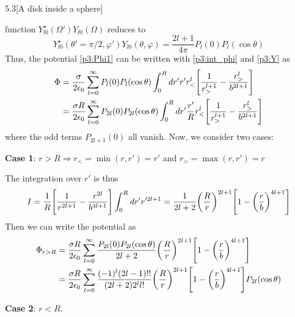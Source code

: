 \documentclass[12pt]{article}
\begin{document}
\begin{problem}{5.3}[A disk inside a sphere]
\begin{solution}
function $Y_{l0}^\star(\Omega')Y_{l0}(\Omega)$ reduces to
\begin{equation}\label{p3:Y}
    Y_{l0}^\star(\theta'=\pi/2,\varphi')Y_{l0}(\theta,\varphi)
    =\frac{2l+1}{4\pi}P_l(0)P_l(\cos\theta)
\end{equation}
Thus, the potential \eqref{p3:Phi1} can be written with \eqref{p3:int_phi} and
\eqref{p3:Y} as
\begin{align}
    \Phi
    &=\frac{\sigma}{2\epsilon_0}\sum_{l=0}^\infty P_l(0)P_{l}(\cos\theta)
    \int_0^Rdr' r'r_<^l\qty[\frac1{r_>^{l+1}}-\frac{r_>^l}{b^{2l+1}}]\notag\\
    &=\frac{\sigma R}{2\epsilon_0}\sum_{l=0}^\infty P_{2l}(0)P_{2l}(\cos\theta)
    \int_0^Rdr'\frac{r'}{R}r_<^l\qty[\frac1{r_>^{l+1}}-\frac{r_>^l}{b^{2l+1}}]
\end{align}
where the odd terms $P_{2l+1}(0)$ all vanish. Now, we consider two cases:

\qquad \textbf{Case 1}: $r>R\Rightarrow r_< =\min(r,r')=r'$ and $r_>
=\max(r,r')=r$

The integration over $r'$ is thus
\begin{equation}
    I=\frac1R\qty[\frac1{r^{2l+1}}-\frac{r^{2l}}{b^{4l+1}}]\int_0^Rdr' r'^{2l+1}
    =\frac1{2l+2}\qty(\frac{R}{r})^{2l+1}\qty[1-\qty(\frac{r}{b})^{4l+1}]
\end{equation}
Then we can write the potential as
\begin{align}\label{p3:Phi_out}
    \Phi_{r>R}&=\frac{\sigma
    R}{2\epsilon_0}\sum_{l=0}^\infty\frac{P_{2l}(0)P_{2l}(\cos\theta)}{2l+2}\qty(\frac{R}{r})^{2l+1}\qty[1-\qty(\frac{r}{b})^{4l+1}]\notag\\
    &=\frac{\sigma R}{2\epsilon_0}\sum_{l=0}^\infty
        \frac{(-1)^l(2l-1)!!}{(2l+2)2^ll!}\qty(\frac{R}{r})^{2l+1}
        \qty[1-\qty(\frac{r}{b})^{4l+1}]P_{2l}(\cos\theta)
\end{align}

\qquad \textbf{Case 2}: $r<R$.


\end{solution}
\end{problem}
\end{document}
